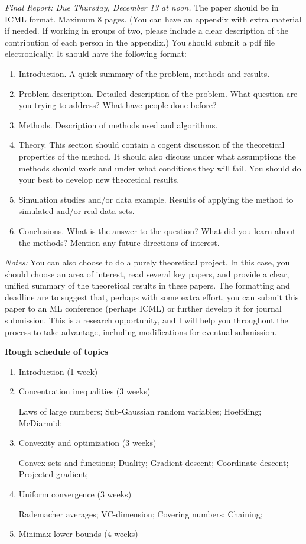 \documentclass[10pt]{article}
\begin{document}
{\em Final Report: Due Thursday, December 13 at noon.} The paper should be in
ICML format. Maximum 8 pages. (You can have an appendix with extra
material if needed. If working in groups of two, please include a
clear description of the contribution of each person in the appendix.)
You should submit a pdf file electronically. It should have the
following format: 
\begin{enumerate}
\item Introduction. A quick summary of the problem, methods and results.
\item Problem description. Detailed description of the problem. What
  question are you trying to address? What have people done before?
\item Methods. Description of methods used and algorithms.
\item Theory. This section should contain a cogent discussion of the
  theoretical properties of the 
  method. It should also discuss under what assumptions the methods
  should work and under 
  what conditions they will fail. You should do your best to develop
  new theoretical results.
\item Simulation studies and/or data example. Results of applying the
  method to simulated and/or real data sets.
\item Conclusions. What is the answer to the question? What did you learn about the methods?
Mention any future directions of interest.
\end{enumerate}

{\em Notes:} You can also choose to do a purely theoretical project. In
this case, you should choose an area of interest, read several key
papers, and provide a clear, unified summary of the theoretical
results in these papers. The formatting and deadline are to suggest that, perhaps
with some extra effort, you can submit this paper to an ML conference
(perhaps ICML) or further develop it for journal submission. This is a
research opportunity, and I will help you throughout the process to
take advantage, including modifications for eventual submission.

{\bf Rough schedule of topics}

\begin{enumerate}
\item Introduction (1 week)
\item Concentration inequalities (3 weeks)

Laws of large numbers; Sub-Gaussian random variables; Hoeffding; McDiarmid;
\item Convexity and optimization (3 weeks)

Convex sets and functions; Duality; Gradient descent; Coordinate
descent; Projected gradient; 
\item Uniform convergence (3 weeks)

Rademacher averages; VC-dimension; Covering numbers; Chaining;
\item Minimax lower bounds (4 weeks)

\end{enumerate}



\end{document}
